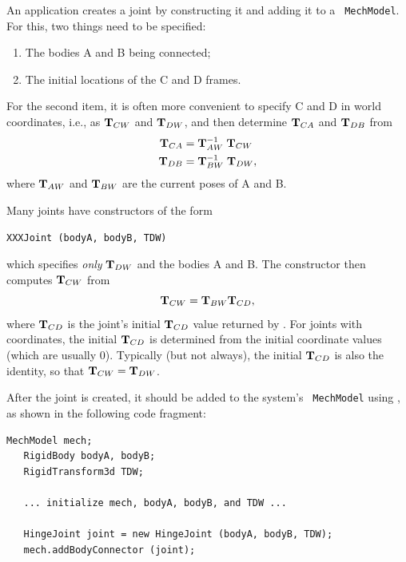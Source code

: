 An application creates a joint by constructing it and adding it to a {\tt
MechModel}. For this, two things need to be specified:
%
\begin{enumerate}
\item The bodies A and B being connected;

\item The initial locations of the C and D frames.	
\end{enumerate}
%
For the second item, it is often more convenient to specify C and D in world
coordinates, i.e., as ${\bf T}_{CW}$ and ${\bf T}_{DW}$, and then determine ${\bf T}_{CA}$ and
${\bf T}_{DB}$ from
%
\begin{align}
{\bf T}_{CA} & = {\bf T}_{AW}^{-1} \; {\bf T}_{CW} \\
{\bf T}_{DB} & = {\bf T}_{BW}^{-1} \; {\bf T}_{DW},
\end{align}
%
where ${\bf T}_{AW}$ and ${\bf T}_{BW}$ are the current poses of A and B.

Many joints have constructors of the form
%
\begin{lstlisting}[]
  XXXJoint (bodyA, bodyB, TDW)
\end{lstlisting}
%
which specifies {\it only} ${\bf T}_{DW}$ and the bodies A and B. The constructor
then computes ${\bf T}_{CW}$ from
%
\begin{equation}
{\bf T}_{CW} = {\bf T}_{BW} {\bf T}_{CD},
\label{initialTCW:eqn}
\end{equation}
%
where ${\bf T}_{CD}$ is the joint's initial ${\bf T}_{CD}$ value returned by
. For joints
with coordinates, the initial ${\bf T}_{CD}$ is determined from the initial
coordinate values (which are usually 0). Typically (but not always), the
initial ${\bf T}_{CD}$ is also the identity, so that ${\bf T}_{CW} = {\bf T}_{DW}$.

After the joint is created, it should be added to the system's {\tt
MechModel} using
, as
shown in the following code fragment:
%
\begin{lstlisting}[]
   MechModel mech; 
   RigidBody bodyA, bodyB;
   RigidTransform3d TDW;

   ... initialize mech, bodyA, bodyB, and TDW ...
   
   HingeJoint joint = new HingeJoint (bodyA, bodyB, TDW);
   mech.addBodyConnector (joint);
\end{lstlisting}
%

